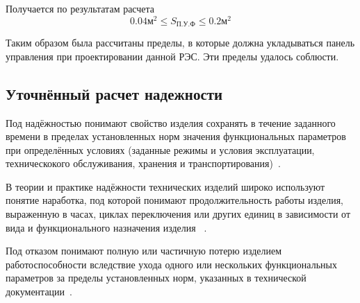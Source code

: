 Получается по результатам расчета
$$  0.04 \text{м}^2 \leq S_{\text{П.У.Ф}} \leq 0.2 \text{м}^2$$

Таким образом была рассчитаны пределы, в которые должна укладываться
панель управления при проектировании данной РЭС.
Эти пределы удалось соблюсти.

\subsection{Уточнённый расчет надежности}

Под надёжностью понимают свойство изделия сохранять в течение
заданного времени в пределах установленных норм значения
функциональных параметров при определённых условиях (заданные режимы и
условия эксплуатации, техническокого обслуживания, хранения и
транспортирования)~\cite{Borovikov2010}.

В теории и практике надёжности технических изделий широко используют
понятие наработка, под которой понимают продолжительность работы
изделия, выраженную в часах, циклах переключения или других единиц в
зависимости от вида и функционального назначения изделия ~\cite{Borovikov2010}.

Под отказом понимают полную или частичную потерю изделием
работоспособности вследствие ухода одного или нескольких
функциональных параметров за пределы установленных норм, указанных в
технической документации~\cite{Borovikov2010}.

